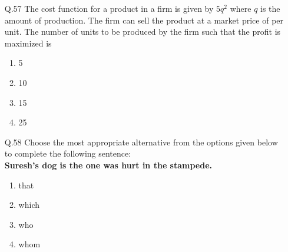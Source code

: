 \documentclass[journal]{IEEEtran}
\begin{document}
\begin{enumerate}
          \textbf{Despite several \underline{\hspace{2cm}} the mission succeeded in its attempt to resolve the conflict.} \\
            \begin{multicols}{4}
            \begin{enumerate}
                \item attempts
                \item setbacks
                \item meetings
                \item delegations
            \end{enumerate}
                
            \end{multicols}
            \item[Q.57] The cost function for a product in a firm is given by $5q^2$ where $q$ is the amount of production. The firm can sell the product at a market price of  per unit. The number of units to be produced by the firm such that the profit is maximized is
\begin{multicols}{4}
    

    \begin{enumerate}
        \item 5
        \item 10
        \item 15
        \item 25
    \end{enumerate} 
    \end{multicols}
\item[Q.58] Choose the most appropriate alternative from the options given below to complete the following sentence:\\

   \textbf{Suresh's dog is the one \underline{\hspace{2cm}} was hurt in the stampede. } 
\begin{multicols}{4}
    

    \begin{enumerate}
        \item that
        \item which
        \item who
        \item whom
    \end{enumerate}
    \end{multicols}


\end{enumerate}
\end{document}
